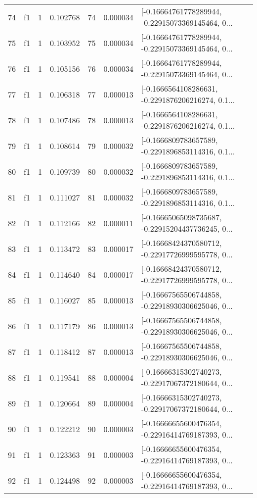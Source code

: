 \begin{tabular}{lllrlrl}
74  &  f1 &   1 &  0.102768 &   74 &  0.000034 &  [-0.16664761778289944, -0.22915073369145464, 0... \\
75  &  f1 &   1 &  0.103952 &   75 &  0.000034 &  [-0.16664761778289944, -0.22915073369145464, 0... \\
76  &  f1 &   1 &  0.105156 &   76 &  0.000034 &  [-0.16664761778289944, -0.22915073369145464, 0... \\
77  &  f1 &   1 &  0.106318 &   77 &  0.000013 &  [-0.1666564108286631, -0.2291876206216274, 0.1... \\
78  &  f1 &   1 &  0.107486 &   78 &  0.000013 &  [-0.1666564108286631, -0.2291876206216274, 0.1... \\
79  &  f1 &   1 &  0.108614 &   79 &  0.000032 &  [-0.1666809783657589, -0.2291896853114316, 0.1... \\
80  &  f1 &   1 &  0.109739 &   80 &  0.000032 &  [-0.1666809783657589, -0.2291896853114316, 0.1... \\
81  &  f1 &   1 &  0.111027 &   81 &  0.000032 &  [-0.1666809783657589, -0.2291896853114316, 0.1... \\
82  &  f1 &   1 &  0.112166 &   82 &  0.000011 &  [-0.16665065098735687, -0.22915204437736245, 0... \\
83  &  f1 &   1 &  0.113472 &   83 &  0.000017 &  [-0.16668424370580712, -0.22917726999595778, 0... \\
84  &  f1 &   1 &  0.114640 &   84 &  0.000017 &  [-0.16668424370580712, -0.22917726999595778, 0... \\
85  &  f1 &   1 &  0.116027 &   85 &  0.000013 &  [-0.16667565506744858, -0.22918930306625046, 0... \\
86  &  f1 &   1 &  0.117179 &   86 &  0.000013 &  [-0.16667565506744858, -0.22918930306625046, 0... \\
87  &  f1 &   1 &  0.118412 &   87 &  0.000013 &  [-0.16667565506744858, -0.22918930306625046, 0... \\
88  &  f1 &   1 &  0.119541 &   88 &  0.000004 &  [-0.16666315302740273, -0.22917067372180644, 0... \\
89  &  f1 &   1 &  0.120664 &   89 &  0.000004 &  [-0.16666315302740273, -0.22917067372180644, 0... \\
90  &  f1 &   1 &  0.122212 &   90 &  0.000003 &  [-0.16666655600476354, -0.22916414769187393, 0... \\
91  &  f1 &   1 &  0.123363 &   91 &  0.000003 &  [-0.16666655600476354, -0.22916414769187393, 0... \\
92  &  f1 &   1 &  0.124498 &   92 &  0.000003 &  [-0.16666655600476354, -0.22916414769187393, 0... \\

\end{tabular}
